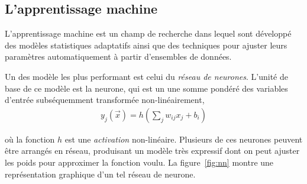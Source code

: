 \subsection{L'apprentissage machine}
\label{sec:susy_atlas:dl:ml}

L'apprentissage machine est un champ de recherche dans lequel sont
développé des modèles statistiques adaptatifs ainsi que des techniques
pour ajuster leurs paramètres automatiquement à partir
d'ensembles de données.

Un des modèle les plus performant est celui du \emph{réseau de
  neurones}. L'unité de base de ce modèle est la neurone, qui est un
une somme pondéré des variables d'entrée subséquemment transformée
non-linéairement,
\begin{eqnarray}
  y_j(\overrightarrow{x}) = h\left(\sum_jw_{ij}x_j + b_i\right)
\end{eqnarray}

\noindent où la fonction $h$ est une \emph{activation} non-linéaire. Plusieurs
de ces neurones peuvent être arrangés en réseau, produisant un modèle
très expressif dont on peut ajuster les poids pour approximer la fonction voulu.
La figure~\ref{fig:nn} montre une représentation graphique d'un tel
réseau de neurone.

